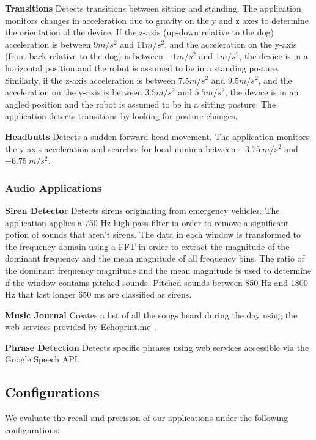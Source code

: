 {\bf Transitions} Detects transitions between sitting and
  standing.  The application monitors changes in acceleration due to
  gravity on the y and z axes to determine the orientation of the
  device. If the z-axis (up-down relative to the dog) acceleration is
  between $9 m/s^2$ and $11 m/s^2$, and the acceleration on the y-axis
  (front-back relative to the dog) is between $-1 m/s^2$ and $1
  m/s^2$, the device is in a horizontal position and the robot is
  assumed to be in a standing posture. Similarly, if the z-axis
  acceleration is between $7.5 m/s^2$ and $9.5 m/s^2$, and the
  acceleration on the y-axis is between $3.5 m/s^2$ and $5.5 m/s^2$,
  the device is in an angled position and the robot is assumed to be
  in a sitting posture. The application detects transitions by looking
  for posture changes.

{\bf Headbutts} Detects a sudden forward head movement.  The
  application monitors the y-axis acceleration and searches for local
  minima between $-3.75\:m/s^2$ and $-6.75\:m/s^2$.

\subsubsection{Audio Applications}

{\bf Siren Detector} Detects sirens originating from
emergency vehicles.  The application applies a 750 Hz high-pass filter 
in order to remove a significant
potion of sounds that aren't sirens.  The data in each window is transformed 
to the frequency domain using a FFT in order to extract the magnitude of the 
dominant frequency and the mean magnitude of all frequency bins.  The ratio
of the dominant frequency magnitude and the mean magnitude is used to determine
if the window contains pitched sounds.  Pitched sounds between 850 Hz and 1800 Hz
that last longer 650 ms are classified as sirens. 

{\bf Music Journal} Creates a list of all the songs heard during the
day using the web services provided by Echoprint.me~\cite{echoprint}.

{\bf Phrase Detection} Detects specific phrases using web services
accessible via the Google Speech API.


\subsection{Configurations}

We evaluate the recall and precision of our applications under the following configurations:

